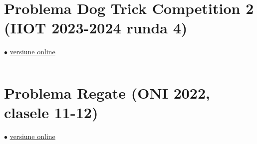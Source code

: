 \documentclass[../main.tex]{subfiles}
\begin{document}
\inputminted{cpp}{../src/graphs/case-of-computer-network.cpp}

\section{Problema Dog Trick Competition 2 (IIOT 2023-2024 runda 4)}
\label{code:dog-trick-competition-2}
$\bullet$
\href{https://kilonova.ro/submissions/586085}{versiune online}

\inputminted{cpp}{../src/graphs/dog-trick-competition-2.cpp}

\section{Problema Regate (ONI 2022, clasele 11-12)}
\label{code:regate}
$\bullet$
\href{https://kilonova.ro/submissions/961234}{versiune online}

\inputminted{cpp}{../src/graphs/regate.cpp}
\end{document}
